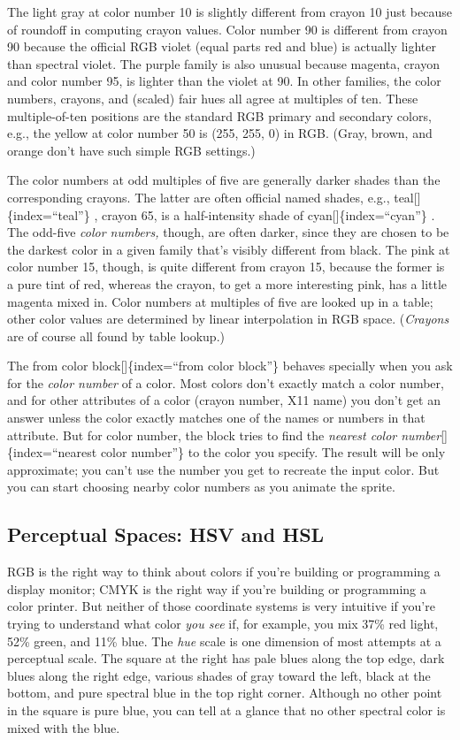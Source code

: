 \documentclass[
  letterpaper,
]{book}
\begin{document}
The light gray at color number 10 is slightly different from crayon 10
just because of roundoff in computing crayon values. Color number 90 is
different from crayon 90 because the official RGB violet (equal parts
red and blue) is actually lighter than spectral violet. The purple
family is also unusual because magenta, crayon and color number 95, is
lighter than the violet at 90. In other families, the color numbers,
crayons, and (scaled) fair hues all agree at multiples of ten. These
multiple-of-ten positions are the standard RGB primary and secondary
colors, e.g., the yellow at color number 50 is (255, 255, 0) in RGB.
(Gray, brown, and orange don't have such simple RGB settings.)

The color numbers at odd multiples of five are generally darker shades
than the corresponding crayons. The latter are often official named
shades, e.g., teal{[}{]}\{index=``teal''\} , crayon 65, is a
half-intensity shade of cyan{[}{]}\{index=``cyan''\} . The odd-five
\emph{color numbers,} though, are often darker, since they are chosen to
be the darkest color in a given family that's visibly different from
black. The pink at color number 15, though, is quite different from
crayon 15, because the former is a pure tint of red, whereas the crayon,
to get a more interesting pink, has a little magenta mixed in. Color
numbers at multiples of five are looked up in a table; other color
values are determined by linear interpolation in RGB space.
(\emph{Crayons} are of course all found by table lookup.)

The from color block{[}{]}\{index=``from color block''\} behaves
specially when you ask for the \emph{color number} of a color. Most
colors don't exactly match a color number, and for other attributes of a
color (crayon number, X11 name) you don't get an answer unless the color
exactly matches one of the names or numbers in that attribute. But for
color number, the block tries to find the \emph{nearest color
number}{[}{]}\{index=``nearest color number''\} to the color you
specify. The result will be only approximate; you can't use the number
you get to recreate the input color. But you can start choosing nearby
color numbers as you animate the sprite.

\subsection{Perceptual Spaces: HSV and
HSL}\label{perceptual-spaces-hsv-and-hsl}

RGB is the right way to think about colors if you're building or
programming a display monitor; CMYK is the right way if you're building
or programming a color printer. But neither of those coordinate systems
is very intuitive if you're trying to understand what color \emph{you
see} if, for example, you mix 37\% red light, 52\% green, and 11\% blue.
The \emph{hue} scale is one dimension of most attempts at a perceptual
scale. The square at the right has pale blues along the top edge, dark
blues along the right edge, various shades of gray toward the left,
black at the bottom, and pure spectral blue in the top right corner.
Although no other point in the square is pure blue, you can tell at a
glance that no other spectral color is mixed with the blue.
\end{document}

